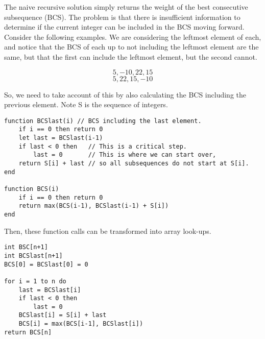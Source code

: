 \documentclass{article}
\begin{document}
    The naive recursive solution simply returns the weight of the best consecutive subsequence (BCS).
    The problem is that there is insufficient information to determine if the current integer can be included in the BCS moving forward.
    Consider the following examples. We are considering the leftmost element of each, and notice that the BCS of each up to not including the leftmost element are the same, but that the first can include the leftmost element, but the second cannot.
    
    \[5, -10, 22, 15 \]
    \[5, 22, 15, -10 \]
    
    So, we need to take account of this by also calculating the BCS including the previous element. Note S is the sequence of integers.
    
    \begin{lstlisting}
function BCSlast(i) // BCS including the last element.
    if i == 0 then return 0
    let last = BCSlast(i-1)
    if last < 0 then   // This is a critical step.
        last = 0       // This is where we can start over,
    return S[i] + last // so all subsequences do not start at S[i].
end
    
function BCS(i)
    if i == 0 then return 0
    return max(BCS(i-1), BCSlast(i-1) + S[i])
end
    \end{lstlisting}
    
    Then, these function calls can be transformed into array look-ups.
    
    \begin{lstlisting}
int BSC[n+1]
int BCSlast[n+1]
BCS[0] = BCSlast[0] = 0

for i = 1 to n do
    last = BCSlast[i]
    if last < 0 then
        last = 0
    BCSlast[i] = S[i] + last
    BCS[i] = max(BCS[i-1], BCSlast[i])
return BCS[n]
    \end{lstlisting}
\end{document}
